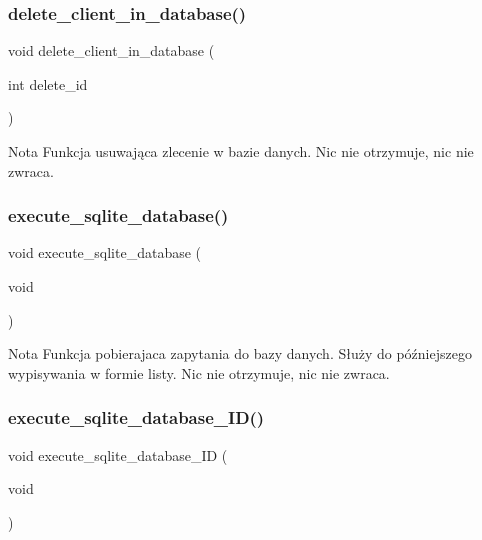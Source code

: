 \subsubsection{delete\_client\_in\_database()}
{\footnotesize\ttfamily void delete\+\_\+client\+\_\+in\+\_\+database (\begin{DoxyParamCaption}\item[{int}]{delete\+\_\+id }\end{DoxyParamCaption})}


\begin{DoxyCode}{0}
\end{DoxyCode}
 \begin{DoxyNote}{Nota}
Funkcja usuwająca zlecenie w bazie danych. Nic nie otrzymuje, nic nie zwraca. 
\end{DoxyNote}
\mbox{\label{client__management_8hpp_a9b61cf3bf58fc7b4fc02e97d948d04c3}} 
\subsubsection{execute\_sqlite\_database()}
{\footnotesize\ttfamily void execute\+\_\+sqlite\+\_\+database (\begin{DoxyParamCaption}\item[{void}]{ }\end{DoxyParamCaption})}


\begin{DoxyCode}{0}
\end{DoxyCode}
 \begin{DoxyNote}{Nota}
Funkcja pobierajaca zapytania do bazy danych. Służy do późniejszego wypisywania w formie listy. Nic nie otrzymuje, nic nie zwraca. 
\end{DoxyNote}
\mbox{\label{client__management_8hpp_a955a231962a4bd5b3c17c3db0ff93612}} 
\subsubsection{execute\_sqlite\_database\_ID()}
{\footnotesize\ttfamily void execute\+\_\+sqlite\+\_\+database\+\_\+\+ID (\begin{DoxyParamCaption}\item[{void}]{ }\end{DoxyParamCaption})}



